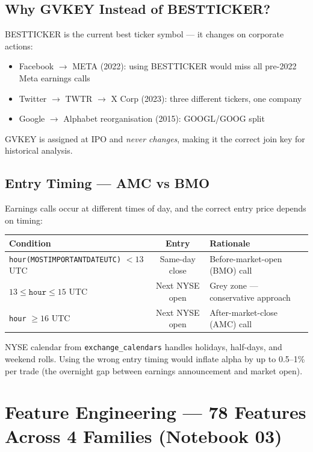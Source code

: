\documentclass[11pt,a4paper]{article}
\begin{document}
\subsection{Why GVKEY Instead of BESTTICKER?}

BESTTICKER is the current best ticker symbol --- it changes on corporate actions:
\begin{itemize}[nosep]
  \item Facebook $\to$ META (2022): using BESTTICKER would miss all pre-2022 Meta earnings calls
  \item Twitter $\to$ TWTR $\to$ X Corp (2023): three different tickers, one company
  \item Google $\to$ Alphabet reorganisation (2015): GOOGL/GOOG split
\end{itemize}

GVKEY is assigned at IPO and \emph{never changes}, making it the correct join key for historical analysis.

\subsection{Entry Timing --- AMC vs BMO}

Earnings calls occur at different times of day, and the correct entry price depends on timing:

\begin{center}
\begin{tabular}{lcl}
\toprule
\textbf{Condition} & \textbf{Entry} & \textbf{Rationale}\\
\midrule
\texttt{hour(MOSTIMPORTANTDATEUTC)} $< 13$ UTC & Same-day close & Before-market-open (BMO) call\\
$13 \le \texttt{hour} \le 15$ UTC & Next NYSE open & Grey zone --- conservative approach\\
\texttt{hour} $\ge 16$ UTC & Next NYSE open & After-market-close (AMC) call\\
\bottomrule
\end{tabular}
\end{center}

NYSE calendar from \texttt{exchange\_calendars} handles holidays, half-days, and weekend rolls. Using the wrong entry timing would inflate alpha by up to 0.5--1\% per trade (the overnight gap between earnings announcement and market open).

\section{Feature Engineering --- 78 Features Across 4 Families (Notebook 03)}
\end{document}
